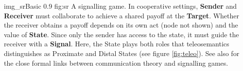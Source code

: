 \begin{myfig}
    {img_srBasic} %
    {0.9} %
    {fig:sr} %
    {A signalling game.
    In cooperative settings, \textbf{Sender} and \textbf{Receiver} must collaborate to achieve a shared payoff at the \textbf{Target}.
    Whether the receiver obtains a payoff depends on its own act (node not shown) and the value of \textbf{State}.
    Since only the sender has access to the state, it must guide the receiver with a \textbf{Signal}.
    Here, the State plays both roles that teleosemantics distinguishes as Proximate and Distal States (see figure \ref{fig:teleo}).
    See also \citet{martinez2019deception} for the close formal links between communication theory and signalling games.
    } %
\end{myfig}